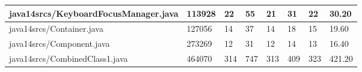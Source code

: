 \begin{tabular}{|l|l|l|l|l|l|l|l|}
\hline
java14srcs/KeyboardFocusManager.java               & 113928      & 22        & 55        & 21        & 31        & 22        & 30.20     \\
\hline
java14srcs/Container.java                          & 127056      & 14        & 37        & 14        & 18        & 15        & 19.60     \\
\hline
java14srcs/Component.java                          & 273269      & 12        & 31        & 12        & 14        & 13        & 16.40     \\
\hline
java14srcs/CombinedClass1.java                     & 464070      & 314       & 747       & 313       & 409       & 323       & 421.20    \\
\hline
\end{tabular}